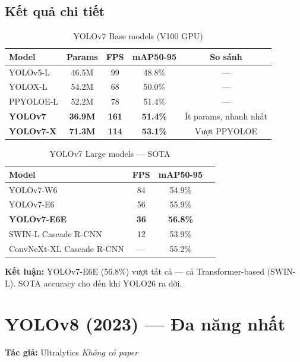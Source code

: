 \subsection{Kết quả chi tiết}
\begin{table}[H]\centering
\caption{YOLOv7 Base models (V100 GPU)}
\begin{tabular}{lcccc}\toprule
\textbf{Model} & \textbf{Params} & \textbf{FPS} & \textbf{mAP50-95} & \textbf{So sánh}\\\midrule
YOLOv5-L & 46.5M & 99 & 48.8\% & --- \\
YOLOX-L & 54.2M & 68 & 50.0\% & --- \\
PPYOLOE-L & 52.2M & 78 & 51.4\% & --- \\
\textbf{YOLOv7} & \textbf{36.9M} & \textbf{161} & \textbf{51.4\%} & Ít params, nhanh nhất \\
\textbf{YOLOv7-X} & \textbf{71.3M} & \textbf{114} & \textbf{53.1\%} & Vượt PPYOLOE \\\bottomrule
\end{tabular}
\end{table}

\begin{table}[H]\centering
\caption{YOLOv7 Large models --- SOTA}
\begin{tabular}{lccc}\toprule
\textbf{Model} & \textbf{FPS} & \textbf{mAP50-95}\\\midrule
YOLOv7-W6 & 84 & 54.9\% \\
YOLOv7-E6 & 56 & 55.9\% \\
\textbf{YOLOv7-E6E} & \textbf{36} & \textbf{56.8\%} \\
SWIN-L Cascade R-CNN & 12 & 53.9\% \\
ConvNeXt-XL Cascade R-CNN & --- & 55.2\% \\\bottomrule
\end{tabular}
\end{table}

\textbf{Kết luận:} YOLOv7-E6E (56.8\%) vượt tất cả --- cả Transformer-based (SWIN-L). SOTA accuracy cho đến khi YOLO26 ra đời.

\section{YOLOv8 (2023) --- Đa năng nhất}
\textbf{Tác giả:} Ultralytics \hfill \textit{Không có paper}

